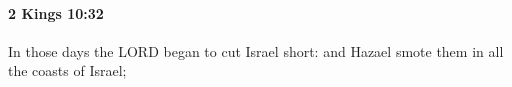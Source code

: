 
		\paragraph{2 Kings 10:32} %
			\label{2KINGS-10-32}

			In those days the LORD began to cut Israel short: and Hazael smote them in all the coasts of Israel;


